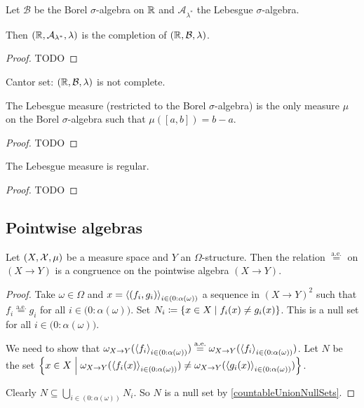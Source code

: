 \begin{proposition}
Let $\mathcal{B}$ be the Borel $\sigma$-algebra on $\mathbb{R}$ and $\mathcal{A}_{\lambda^*}$ the Lebesgue $\sigma$-algebra.

Then $\left( \mathbb{R}, \mathcal{A}_{\lambda^*}, \lambda \right)$ is the completion of $\left( \mathbb{R}, \mathcal{B}, \lambda \right)$.
\end{proposition}
\begin{proof}
TODO
\end{proof}

\begin{example}
Cantor set: $\left( \mathbb{R}, \mathcal{B}, \lambda \right)$ is not complete.
\end{example}

\begin{proposition}
The Lebesgue measure (restricted to the Borel $\sigma$-algebra) is the only measure $\mu$ on the Borel $\sigma$-algebra such that $\mu([a,b]) = b-a$.
\end{proposition}
\begin{proof}
TODO
\end{proof}

\begin{proposition}
The Lebesgue measure is regular.
\end{proposition}
\begin{proof}
TODO
\end{proof}

\subsection{Pointwise algebras}
\begin{lemma} \label{equalAECongruence}
Let $\left( X, \mathcal{X}, \mu \right)$ be a measure space and $Y$ an $\Omega$-structure. Then the relation $\overset{\text{a.e.}}{=}$ on $(X\to Y)$ is a congruence on the pointwise algebra $(X\to Y)$.
\end{lemma}
\begin{proof}
Take $\omega\in\Omega$ and $x = \left\langle (f_i,g_i) \right\rangle_{i\in(0:\alpha(\omega))}$ a sequence in $(X\to Y)^2$ such that $f_i\mathrel{\overset{\text{a.e.}}{=}} g_i$ for all $i\in \big(0:\alpha(\omega)\big)$. Set $N_i \coloneqq \left\{ x\in X \;\middle|\; f_i(x)\neq g_i(x) \right\}$. This is a null set for all $i\in\big(0:\alpha(\omega)\big)$.

We need to show that $\omega_{X\to Y}(\left\langle f_i \right\rangle_{i\in(0:\alpha(\omega))})\mathrel{\overset{\text{a.e.}}{=}}\omega_{X\to Y}(\left\langle f_i \right\rangle_{i\in(0:\alpha(\omega))})$. Let $N$ be the set $\left\{ x\in X \;\middle|\; \omega_{X\to Y}(\left\langle f_i(x) \right\rangle_{i\in(0:\alpha(\omega))}) \neq \omega_{X\to Y}(\left\langle g_i(x) \right\rangle_{i\in(0:\alpha(\omega))}) \right\}$.

Clearly $N\subseteq \bigcup_{i\in(0:\alpha(\omega))}N_i$. So $N$ is a null set by \ref{countableUnionNullSets}.
\end{proof}

